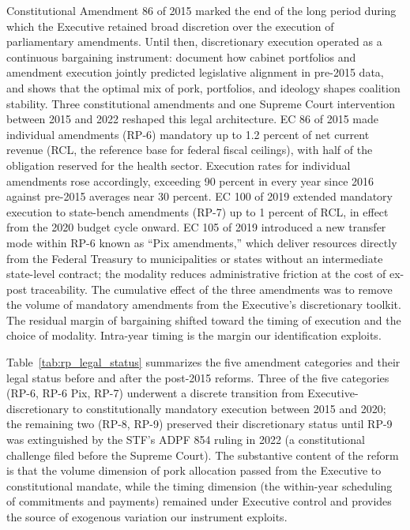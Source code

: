 \documentclass[preprint,12pt,authoryear]{elsarticle}
\begin{document}
Constitutional Amendment 86 of 2015 marked the end of the long period during which the Executive retained broad discretion over the execution of parliamentary amendments. Until then, discretionary execution operated as a continuous bargaining instrument: \citet{PereiraAndMueller2004} document how cabinet portfolios and amendment execution jointly predicted legislative alignment in pre-2015 data, and \citet{Raile2011} shows that the optimal mix of pork, portfolios, and ideology shapes coalition stability. Three constitutional amendments and one Supreme Court intervention between 2015 and 2022 reshaped this legal architecture. EC 86 of 2015 made individual amendments (RP-6) mandatory up to 1.2 percent of net current revenue (RCL, the reference base for federal fiscal ceilings), with half of the obligation reserved for the health sector. Execution rates for individual amendments rose accordingly, exceeding 90 percent in every year since 2016 against pre-2015 averages near 30 percent. EC 100 of 2019 extended mandatory execution to state-bench amendments (RP-7) up to 1 percent of RCL, in effect from the 2020 budget cycle onward. EC 105 of 2019 introduced a new transfer mode within RP-6 known as ``Pix amendments,'' which deliver resources directly from the Federal Treasury to municipalities or states without an intermediate state-level contract; the modality reduces administrative friction at the cost of ex-post traceability. The cumulative effect of the three amendments was to remove the volume of mandatory amendments from the Executive's discretionary toolkit. The residual margin of bargaining shifted toward the timing of execution and the choice of modality. Intra-year timing is the margin our identification exploits.

Table~\ref{tab:rp_legal_status} summarizes the five amendment categories and their legal status before and after the post-2015 reforms. Three of the five categories (RP-6, RP-6 Pix, RP-7) underwent a discrete transition from Executive-discretionary to constitutionally mandatory execution between 2015 and 2020; the remaining two (RP-8, RP-9) preserved their discretionary status until RP-9 was extinguished by the STF's ADPF 854 ruling in 2022 (a constitutional challenge filed before the Supreme Court). The substantive content of the reform is that the volume dimension of pork allocation passed from the Executive to constitutional mandate, while the timing dimension (the within-year scheduling of commitments and payments) remained under Executive control and provides the source of exogenous variation our instrument exploits.
\end{document}
